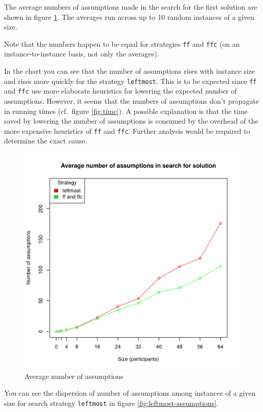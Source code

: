 \documentclass{article}
\newcommand{\code}[1]{\texttt{#1}}
\begin{document}
The average numbers of assumptions made in the search for the first solution
are shown in figure \ref{fig:assumptions}.
The averages run across up to 10 random instances of a given size.

Note that the numbers happen to be equal for strategies \code{ff} and \code{ffc}
(on an instance-to-instance basis, not only the averages).

In the chart you can see that the number of assumptions rises with instance size
and rises more quickly for the strategy \code{leftmost}.
This is to be expected since \code{ff} and \code{ffc} use more elaborate heuristics
for lowering the expected number of assumptions.
However, it seems that the numbers of assumptions don't propagate in running times
(cf.~figure \ref{fig:time}).
A possible explanation is that the time saved by lowering the number of assumptions
is consumed by the overhead of the more expensive heuristics
of \code{ff} and \code{ffc}.
Further analysis would be required to determine the exact cause.

\begin{figure}
\centering
\includegraphics[width=\linewidth]{assumptions}
\caption{Average number of assumptions}
\label{fig:assumptions}
\end{figure}

You can see the dispersion of number of assumptions among instances of a given size
for search strategy \code{leftmost} in figure \ref{fig:leftmost-assumptions}.
\end{document}
